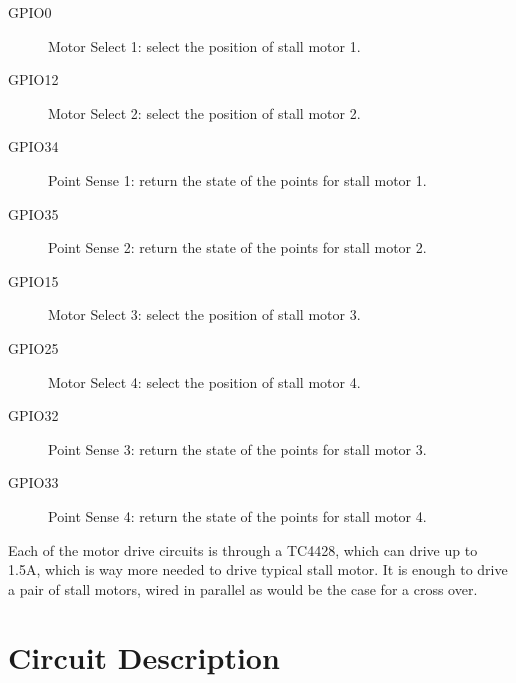 \begin{description}
\item[GPIO0] Motor Select 1: select the position of stall motor 
1. 
\item[GPIO12] Motor Select 2: select the position of stall motor 
2. 
\item[GPIO34] Point Sense 1: return the state of the points for 
stall motor 1. 
\item[GPIO35] Point Sense 2: return the state of the points for 
stall motor 2. 
\item[GPIO15] Motor Select 3: select the position of stall motor 
3. 
\item[GPIO25] Motor Select 4: select the position of stall motor 
4. 
\item[GPIO32] Point Sense 3: return the state of the points for 
stall motor 3. 
\item[GPIO33] Point Sense 4: return the state of the points for 
stall motor 4. 
\end{description}

Each of the motor drive circuits is through a TC4428, which can drive up to
1.5A, which is way more needed to drive typical stall motor. It is enough to
drive a pair of stall motors, wired in parallel as would be the case for a
cross over. 

\section{Circuit Description}

